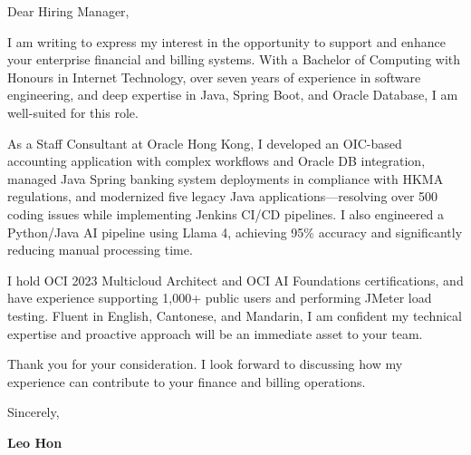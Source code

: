 \documentclass{resume}
\begin{document}

Dear Hiring Manager,

\vspace{1em}

I am writing to express my interest in the opportunity to support and enhance your enterprise financial and billing systems. With a Bachelor of Computing with Honours in Internet Technology, over seven years of experience in software engineering, and deep expertise in Java, Spring Boot, and Oracle Database, I am well-suited for this role.

\vspace{1em}

As a Staff Consultant at Oracle Hong Kong, I developed an OIC-based accounting application with complex workflows and Oracle DB integration, managed Java Spring banking system deployments in compliance with HKMA regulations, and modernized five legacy Java applications---resolving over 500 coding issues while implementing Jenkins CI/CD pipelines. I also engineered a Python/Java AI pipeline using Llama 4, achieving 95\% accuracy and significantly reducing manual processing time.

\vspace{1em}

I hold OCI 2023 Multicloud Architect and OCI AI Foundations certifications, and have experience supporting 1,000+ public users and performing JMeter load testing. Fluent in English, Cantonese, and Mandarin, I am confident my technical expertise and proactive approach will be an immediate asset to your team.

\vspace{1em}

Thank you for your consideration. I look forward to discussing how my experience can contribute to your finance and billing operations.

\vspace{3em}

Sincerely,

\vspace{1em}

\textbf{Leo Hon}
\end{document}
